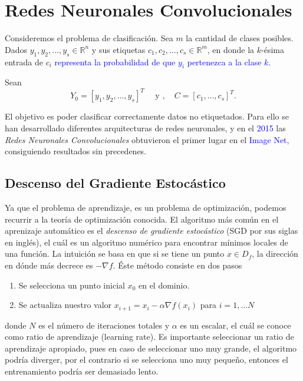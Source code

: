 \section{Redes Neuronales Convolucionales}
Consideremos el problema de clasificación. Sea $m$ la cantidad de clases posibles. Dados $y_1, y_2, ..., y_s \in \mathbb R^n$ y sus etiquetas $c_1, c_2, ..., c_s\in \mathbb R^m$, en donde la $k$-ésima entrada de $c_i$ \textcolor{blue}{representa la probabilidad de que $y_i$ pertenezca a la clase $k$.}

    Sean 
    \begin{equation}
        \label{clasification}
        Y_0 = [y_1, y_2, ..., y_s]^T \quad \text{ y }, \quad  C = [c_1, ..., c_s]^T.
    \end{equation}

    El objetivo es poder clasificar correctamente datos no etiquetados. Para ello se han desarrollado diferentes arquitecturas de redes neuronales, y en el \textcolor{blue}{2015} las \textsl{Redes Neuronales Convolucionales} obtuvieron el primer lugar en el \textcolor{blue}{Image Net}, consiguiendo resultados sin precedenes. 

\subsection{Descenso del Gradiente Estocástico}
Ya que el problema de aprendizaje, es un problema de optimización, podemos recurrir a la teoría de optimización conocida. El algoritmo más común en el aprenizaje automático es el \textsl{descenso de gradiente estocástico} (SGD por sus siglas en inglés), el cuál es un algoritmo numérico para encontrar mínimos locales de una función. La intuición se basa en que si se tiene un punto $x\in D_f$, la dirección en dónde más decrece es $-\nabla f$. Éste método consiste en dos pasos
\begin{enumerate}
    \item Se selecciona un punto inicial $x_0$ en el dominio.
    \item Se actualiza nuestro valor $x_{i+1} = x_i - \alpha\nabla f(x_i)$ para $i = 1, ... N$
\end{enumerate}
donde $N$ es el número de iteraciones totales y $\alpha$ es un escalar, el cuál se conoce como ratio de aprendizaje (learning rate). Es importante seleccionar un ratio de aprendizaje apropiado, pues en caso de seleccionar uno muy grande, el algoritmo podría diverger, por el contrario si se selecciona uno muy pequeño, entonces el entrenamiento podría ser demasiado lento. 

